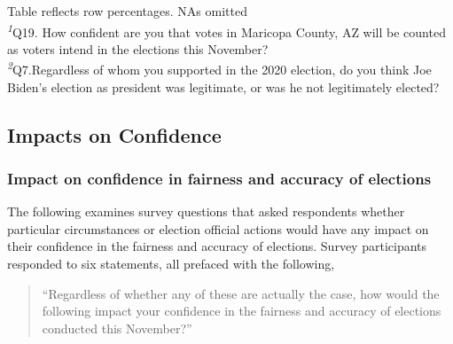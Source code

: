 \documentclass[
  11pt,
  a4paper,
]{article}
\begin{document}
\begin{minipage}{\linewidth}
Table reflects row percentages. NAs omitted\\
\textsuperscript{\textit{1}}Q19. How confident are you that votes in Maricopa County, AZ will be counted as voters intend in the elections this November?\\
\textsuperscript{\textit{2}}Q7.Regardless of whom you supported in the 2020 election, 
do you think Joe Biden's election as president was legitimate, or was he not legitimately elected?\\
\end{minipage}
\endgroup

\subsection{Impacts on Confidence}\label{impacts-on-confidence}

\subsubsection{Impact on confidence in fairness and accuracy of
elections}\label{impact-on-confidence-in-fairness-and-accuracy-of-elections}

The following examines survey questions that asked respondents whether
particular circumstances or election official actions would have any
impact on their confidence in the fairness and accuracy of elections.
Survey participants responded to six statements, all prefaced with the
following,

\begin{quote}
``Regardless of whether any of these are actually the case, how would
the following impact your confidence in the fairness and accuracy of
elections conducted this November?''
\end{quote}
\end{document}
